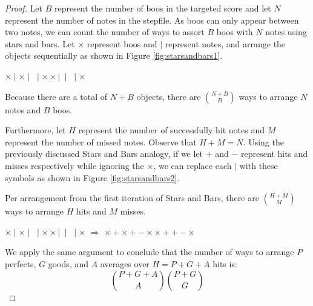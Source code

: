 \begin{proof}
    Let $B$ represent the number of boos in the targeted score and let $N$ represent the number of notes in the stepfile. As boos can only appear between two notes, we can count the number of ways to assort $B$ boos with $N$ notes using stars and bars. Let $\times$ represent boos and $\mid$ represent notes, and arrange the objects sequentially as shown in Figure \ref{fig:starsandbars1}.

\vspace{2mm}

\begin{center}
$ \times \mid\times\mid \; \mid \times \times \mid \; \mid \; \mid \times$
\label{fig:starsandbars1}
\end{center}

Because there are a total of $N+B$ objects, there are $\displaystyle \binom{N+B}{B}$ ways to arrange $N$ notes and $B$ boos.

\vspace{2mm}

Furthermore, let $H$ represent the number of successfully hit notes and $M$ represent the number of missed notes. Observe that $H + M = N$. Using the previously discussed Stars and Bars analogy, if we let $+$ and $-$ represent hits and misses respectively while ignoring the $\times$, we can replace each $\mid$ with these symbols as shown in Figure \ref{fig:starsandbars2}.

\vspace{2mm}

Per arrangement from the first iteration of Stars and Bars, there are $\displaystyle\binom{H + M}{M}$ ways to arrange $H$ hits and $M$ misses.

\begin{center}
$ \times \mid\times\mid \; \mid \times \times \mid \; \mid \; \mid \times$ 	\hspace{5mm} $\Longrightarrow$ \hspace{5mm} $\times + \times +  - \times \times ++- \times $
\label{fig:starsandbars2}
\end{center}

We apply the same argument to conclude that the number of ways to arrange $P$ perfects, $G$ goods, and $A$ averages over $H = P + G + A$ hits is:
$$\displaystyle \binom{P + G + A}{A}\binom{P+G}{G}$$


\end{proof}
